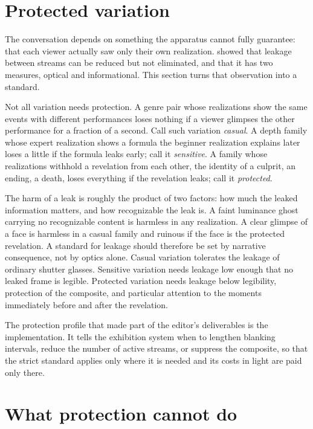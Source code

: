 \section{Protected variation}

The conversation depends on something the apparatus cannot fully guarantee: that each viewer actually saw only their own realization.  showed that leakage between streams can be reduced but not eliminated, and that it has two measures, optical and informational. This section turns that observation into a standard.

Not all variation needs protection. A genre pair whose realizations show the same events with different performances loses nothing if a viewer glimpses the other performance for a fraction of a second. Call such variation \emph{casual}. A depth family whose expert realization shows a formula the beginner realization explains later loses a little if the formula leaks early; call it \emph{sensitive}. A family whose realizations withhold a revelation from each other, the identity of a culprit, an ending, a death, loses everything if the revelation leaks; call it \emph{protected}.

The harm of a leak is roughly the product of two factors: how much the leaked information matters, and how recognizable the leak is. A faint luminance ghost carrying no recognizable content is harmless in any realization. A clear glimpse of a face is harmless in a casual family and ruinous if the face is the protected revelation. A standard for leakage should therefore be set by narrative consequence, not by optics alone. Casual variation tolerates the leakage of ordinary shutter glasses. Sensitive variation needs leakage low enough that no leaked frame is legible. Protected variation needs leakage below legibility, protection of the composite, and particular attention to the moments immediately before and after the revelation.

The protection profile that  made part of the editor's deliverables is the implementation. It tells the exhibition system when to lengthen blanking intervals, reduce the number of active streams, or suppress the composite, so that the strict standard applies only where it is needed and its costs in light are paid only there.

\section{What protection cannot do}

